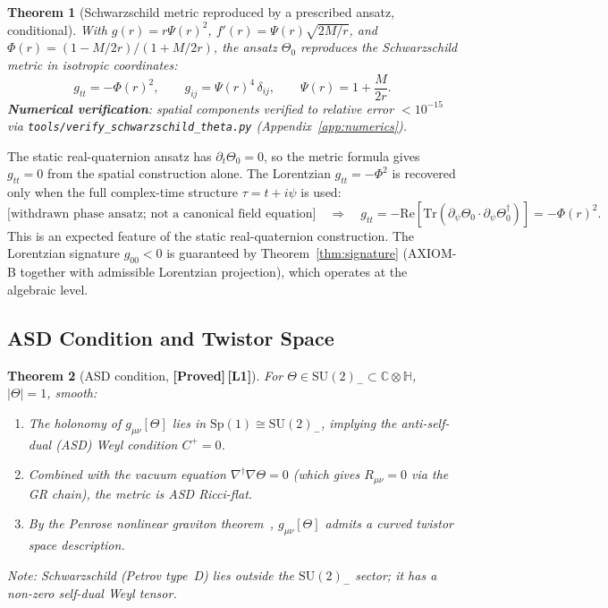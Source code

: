 \documentclass[12pt,a4paper]{article}
\newtheorem{theorem}{Theorem}[section]
\theoremstyle{definition}
\theoremstyle{remark}
\newcommand{\PROVED}{\textbf{[Proved]}}
\newcommand{\Lone}{\textbf{[L1]}}
\newcommand{\CC}{\mathbb{C}}
\newcommand{\HH}{\mathbb{H}}
\newcommand{\Tr}{\mathrm{Tr}}
\newcommand{\re}{\mathrm{Re}}
\begin{document}
\begin{theorem}[Schwarzschild metric reproduced by a prescribed ansatz, conditional]
\label{thm:schwarzschild}
With $g(r) = r\Psi(r)^2$,
$f'(r) = \Psi(r)\sqrt{2M/r}$,
and $\Phi(r) = (1-M/2r)/(1+M/2r)$,
the ansatz $\Theta_0$ reproduces the Schwarzschild metric in isotropic
coordinates:
\[
  g_{tt} = -\Phi(r)^2, \qquad
  g_{ij} = \Psi(r)^4\,\delta_{ij}, \qquad
  \Psi(r) = 1 + \frac{M}{2r}.
\]
\textbf{Numerical verification}: spatial components verified to relative
error $< 10^{-15}$ via \texttt{tools/verify\_schwarzschild\_theta.py}
(Appendix~\ref{app:numerics}).
\end{theorem}

\begin{tcolorbox}[colback=orange!5!white,colframe=orange!50!black,
  title={Complex-time structure and the temporal component}]
The static real-quaternion ansatz has $\partial_t\Theta_0 = 0$, so the metric
formula gives $g_{tt} = 0$ from the spatial construction alone.
The Lorentzian $g_{tt} = -\Phi^2$ is recovered only when the full
complex-time structure $\tau = t + i\psi$ is used:
\[
  \text{[withdrawn phase ansatz; not a canonical field equation]}
  \quad\Longrightarrow\quad
  g_{tt} = -\re[\Tr(\partial_\psi\Theta_0 \cdot \partial_\psi\Theta_0^\dagger)]
          = -\Phi(r)^2.
\]
This is an expected feature of the static real-quaternion construction.
The Lorentzian signature $g_{00} < 0$ is guaranteed by
Theorem~\ref{thm:signature} (AXIOM-B together with admissible Lorentzian projection), which operates at the algebraic level.
\end{tcolorbox}

\subsection{ASD Condition and Twistor Space}

\begin{theorem}[ASD condition, \PROVED\,\Lone]
\label{thm:asd}
For $\Theta \in \mathrm{SU}(2)_- \subset \CC\otimes\HH$, $|\Theta| = 1$,
smooth:
\begin{enumerate}
  \item The holonomy of $g_{\mu\nu}[\Theta]$ lies in
        $\mathrm{Sp}(1) \cong \mathrm{SU}(2)_-$, implying the anti-self-dual
        (ASD) Weyl condition $C^+ = 0$.
  \item Combined with the vacuum equation $\nabla^\dagger\nabla\Theta = 0$
        (which gives $R_{\mu\nu} = 0$ via the GR chain), the metric is
        ASD Ricci-flat.
  \item By the Penrose nonlinear graviton theorem~\cite{penrose1976},
        $g_{\mu\nu}[\Theta]$ admits a curved twistor space description.
\end{enumerate}
\emph{Note}: Schwarzschild (Petrov type~D) lies outside the $\mathrm{SU}(2)_-$
sector; it has a non-zero self-dual Weyl tensor.
\end{theorem}
\end{document}
